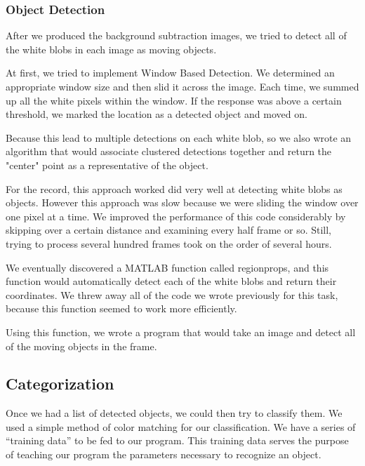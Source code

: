 \documentclass[a4paper, 10pt, conference]{ieeeconf}      %
\begin{document}
\subsubsection{Object Detection}

After we produced the background subtraction images, we tried to detect all of the white blobs in each image as moving objects. \newline

At first, we tried to implement Window Based Detection. We determined an appropriate window size and then slid it across the image. Each time, we summed up all the white pixels within the window. If the response was above a certain threshold, we marked the location as a detected object and moved on. \newline

Because this lead to multiple detections on each white blob, so we also wrote an algorithm that would associate clustered detections together and return the "center" point as a representative of the object. \newline

For the record, this approach worked did very well at detecting white blobs as objects. However this approach was slow because we were sliding the window over one pixel at a time. We improved the performance of this code considerably by skipping over a certain distance and examining every half frame or so. Still, trying to process several hundred frames took on the order of several hours. \newline

We eventually discovered a MATLAB function called regionprops, and this function would automatically detect each of the white blobs and return their coordinates. We threw away all of the code we wrote previously for this task, because this function seemed to work more efficiently. \newline

Using this function, we wrote a program that would take an image and detect all of the moving objects in the frame. \newline


\subsection{Categorization}

Once we had a list of detected objects, we could then try to classify them. We used a simple method of color matching for our classification. We have a series of “training data” to be fed to our program. This training data serves the purpose of teaching our program the parameters necessary to recognize an object.\newline
\end{document}

